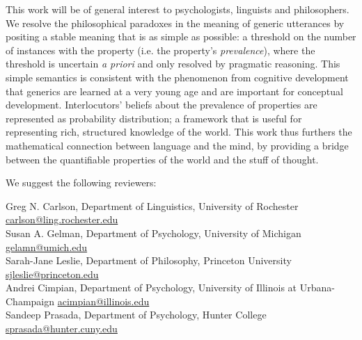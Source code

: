 \documentclass[11pt,stdletter,dateno,sigleft]{newlfm} %
\begin{document}
\begin{newlfm}
This work will be of general interest to psychologists, linguists and philosophers.
We resolve the philosophical paradoxes in the meaning of generic utterances by positing a stable meaning that is as simple as possible: a threshold on the number of instances with the property (i.e. the property's \emph{prevalence}), where the threshold is uncertain \emph{a priori} and only resolved by pragmatic reasoning.
This simple semantics is consistent with the phenomenon from cognitive development that generics are learned at a very young age and are important for conceptual development.
Interlocutors' beliefs about the prevalence of properties are represented as probability distribution; a framework that is useful for representing rich, structured knowledge of the world. 
This work thus furthers the mathematical connection between language and the mind, by providing a bridge between the quantifiable properties of the world and the stuff of thought. 








%


We suggest the following reviewers:

Greg N. Carlson, Department of Linguistics, University of Rochester \url{carlson@ling.rochester.edu}\\
Susan A. Gelman, Department of Psychology, University of Michigan \url{gelamn@umich.edu}\\
Sarah-Jane Leslie, Department of Philosophy, Princeton University \url{sjleslie@princeton.edu} \\
Andrei Cimpian, Department of Psychology, University of Illinois at Urbana-Champaign \url{acimpian@illinois.edu}\\
Sandeep Prasada, Department of Psychology, Hunter College \url{sprasada@hunter.cuny.edu}



\end{newlfm}
\end{document}
